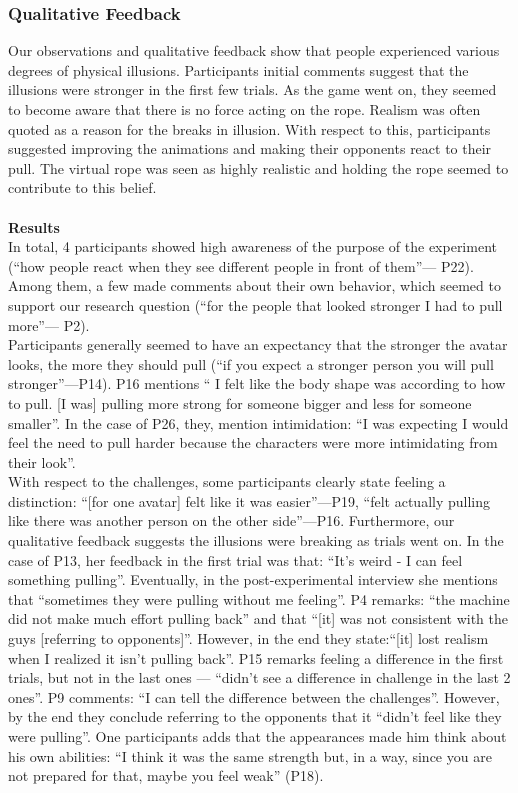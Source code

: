 \subsubsection{Qualitative Feedback}
\label{qualitativeFeedback}
Our observations and qualitative feedback show that people experienced various degrees of physical illusions. Participants initial comments suggest that the illusions were stronger in the first few trials. As the game went on, they seemed to become aware that there is no force acting on the rope. Realism was often quoted as a reason for the breaks in illusion. With respect to this, participants suggested improving the animations and making their opponents react to their pull. The virtual rope was seen as highly realistic and holding the rope seemed to contribute to this belief.\\
\\
\textbf{Results}\\
 In total, 4 participants showed high awareness of the purpose of the experiment (``how people react when they see different people in front of them''--- P22). Among them, a few made comments about their own behavior, which seemed to support our research question (``for the people that looked stronger I had to pull more''--- P2). \\
Participants generally seemed to have an expectancy that the stronger the avatar looks, the more they should pull (``if you expect a stronger person you will pull stronger''---P14). P16 mentions `` I felt like the body shape was according to how to pull. [I was] pulling more strong for someone bigger and less for someone smaller''. In the case of P26, they, mention intimidation: ``I was expecting I would feel the need to pull harder because the characters were more intimidating from their look''.\\
With respect to the challenges, some participants clearly state feeling a distinction: ``[for one avatar] felt like it was easier''---P19, ``felt actually pulling like there was another person on the other side''---P16. Furthermore, our qualitative feedback suggests the illusions were breaking as trials went on. In the case of P13, her feedback in the first trial was that: ``It's weird - I can feel something pulling''. Eventually, in the post-experimental interview she mentions that ``sometimes they were pulling without me feeling''. P4 remarks: ``the machine did not make much effort pulling back'' and that ``[it] was not consistent with the guys [referring to opponents]''. However, in the end they state:``[it] lost realism when I realized it isn't pulling back''. P15 remarks feeling a difference in the first trials, but not in the last ones --- ``didn't see a difference in challenge in the last 2 ones''. P9 comments: ``I can tell the difference between the challenges''. However, by the end they conclude referring to the opponents that it ``didn't feel like they were pulling''. One participants adds that the appearances made him think about his own abilities: ``I think it was the same strength but, in a way, since you are not prepared for that, maybe you feel weak'' (P18).\\
